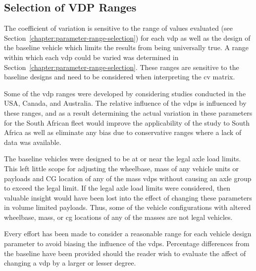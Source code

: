 \subsection{Selection of VDP Ranges}\label{section:discussion-limitations-range}

The coefficient of variation is sensitive to the range of values evaluated (see Section~\ref{chapter:parameter-range-selection}) for each \gls{vdp} as well as the design of the baseline vehicle which limits the results from being universally true. A range within which each \gls{vdp} could be varied was determined in Section~\ref{chapter:parameter-range-selection}. These ranges are sensitive to the baseline designs and need to be considered when interpreting the \gls{cv} matrix.

Some of the \gls{vdp} ranges were developed by considering studies conducted in the USA, Canada, and Australia. The relative influence of the \glspl{vdp} is influenced by these ranges, and as a result determining the actual variation in these parameters for the South African fleet would improve the applicability of the study to South Africa as well as eliminate any bias due to conservative ranges where a lack of data was available.

The baseline vehicles were designed to be at or near the legal axle load limits. This left little scope for adjusting the wheelbase, mass of any vehicle units or payloads and CG location of any of the mass \glspl{vdp} without causing an axle group to exceed the legal limit. If the legal axle load limits were considered, then valuable insight would have been lost into the effect of changing these parameters in volume limited payloads. Thus, some of the vehicle configurations with altered wheelbase, mass, or \gls{cg} locations of any of the masses are not legal vehicles.

Every effort has been made to consider a reasonable range for each vehicle design parameter to avoid biasing the influence of the \glspl{vdp}. Percentage differences from the baseline have been provided should the reader wish to evaluate the affect of changing a \gls{vdp} by a larger or lesser degree.